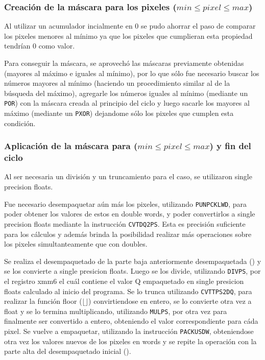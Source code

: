 \subsubsection{Creación de la máscara para los pixeles ($min \leq pixel \leq max$)}
Al utilizar un acumulador incialmente en 0 se pudo ahorrar el paso de comparar los pixeles menores al mínimo ya que los pixeles que cumplieran esta propiedad tendrían 0 como valor.

Para conseguir la máscara, se aprovechó las máscaras previamente obtenidas (mayores al máximo e iguales al mínimo), por lo que sólo fue necesario buscar los números mayores al mínimo (haciendo un procedimiento similar al de la búsqueda del máximo), agregarle los números iguales al mínimo (mediante un \texttt{POR}) con la máscara creada al principio del ciclo y luego sacarle los mayores al máximo (mediante un \texttt{PXOR}) dejandome sólo los pixeles que cumplen esta condición.

\subsubsection{Aplicación de la máscara para ($min \leq pixel \leq max$) y fin del ciclo}
Al ser necesaria un división y un truncamiento para el caso, se utilizaron single precision floats.

Fue necesario desempaquetar aún más los pixeles, utilizando \texttt{PUNPCKLWD}, para poder obtener los valores de estos en double words, y poder convertirlos a single precision floats mediante la instrucción \texttt{CVTDQ2PS}. Esta es precisión suficiente para los cálculos y además brinda la posibilidad realizar más operaciones sobre los pixeles simultanteamente que con doubles.

Se realiza el desempaquetado de la parte baja anteriormente desempaquetada () y se los convierte a single presicion floats. Luego se los divide, utilizando \texttt{DIVPS}, por el registro xmm6 el cuál contiene el valor Q empaquetado en single presicion floats calculado al inicio del programa. Se lo trunca utilizando \texttt{CVTTPS2DQ}, para realizar la función floor ($\lfloor \rfloor$) convirtiendose en entero, se lo convierte otra vez a float y se lo termina multiplicando, utilizando \texttt{MULPS}, por  otra vez para finalmente ser convertido a entero, obteniendo el valor correspondiente para cáda pixel. Se vuelve a empaquetar, utilizando la instrucción \texttt{PACKUSDW}, obteniendose otra vez los valores nuevos de los pixeles en words y se repite la operación con la parte alta del desempaquetado inicial ().

